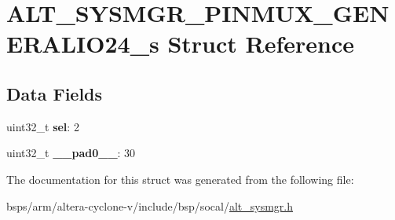 \hypertarget{structALT__SYSMGR__PINMUX__GENERALIO24__s}{}\section{A\+L\+T\+\_\+\+S\+Y\+S\+M\+G\+R\+\_\+\+P\+I\+N\+M\+U\+X\+\_\+\+G\+E\+N\+E\+R\+A\+L\+I\+O24\+\_\+s Struct Reference}
\label{structALT__SYSMGR__PINMUX__GENERALIO24__s}
\subsection*{Data Fields}
\begin{DoxyCompactItemize}
\item 
\mbox{\label{structALT__SYSMGR__PINMUX__GENERALIO24__s_a7bac89d6b7df402b6f2643fe063cacd4}} 
uint32\+\_\+t {\bfseries sel}\+: 2
\item 
\mbox{\label{structALT__SYSMGR__PINMUX__GENERALIO24__s_a7e33c5a767b4208b3f11ab4cd84dfbaa}} 
uint32\+\_\+t {\bfseries \+\_\+\+\_\+pad0\+\_\+\+\_\+}\+: 30
\end{DoxyCompactItemize}


The documentation for this struct was generated from the following file\+:\begin{DoxyCompactItemize}
\item 
bsps/arm/altera-\/cyclone-\/v/include/bsp/socal/\mbox{\hyperlink{alt__sysmgr_8h}{alt\+\_\+sysmgr.\+h}}\end{DoxyCompactItemize}
